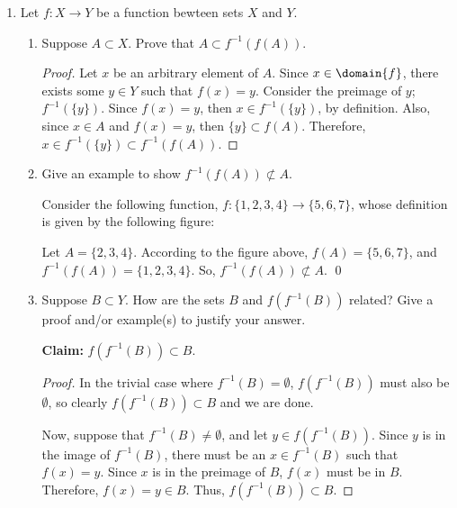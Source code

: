 \documentclass[letterpaper]{article}
\begin{document}
\begin{enumerate}
\item Let $f:X \to Y$ be a function bewteen sets $X$ and $Y$. 
\begin{enumerate}[label=(\alph*)]
\item Suppose $A \subset X$. Prove that $A \subset f^{-1}(f(A))$.
\begin{proof}
Let $x$ be an arbitrary element of $A$. Since $x \in \domain{f}$, there exists some $y \in Y$ such that $f(x)=y$. Consider the preimage of $y$; $f^{-1}(\{y\})$. Since $f(x)=y$, then $x \in f^{-1}(\{y\})$, by definition. Also, since $x \in A$ and $f(x)=y$, then $\{y\} \subset f(A)$. Therefore, $x \in f^{-1}(\{y\}) \subset f^{-1}(f(A)).$
\end{proof}
\pagebreak
\item Give an example to show $f^{-1}(f(A)) \not\subset A$.
\begin{example*} Consider the following function, $f:\{1,2,3,4\} \to \{5,6,7\}$, whose definition is given by the following figure:
\begin{center}
\end{center}
Let $A=\{2,3,4\}$. According to the figure above, $f(A)=\{5,6,7\}$, and $f^{-1}(f(A))=\{1,2,3,4\}$. So, $f^{-1}(f(A)) \not\subset A$. \qed
\end{example*}
\item Suppose $B \subset Y$. How are the sets $B$ and $f(f^{-1}(B))$ related? Give a proof and/or example(s) to justify your answer. 

\textbf{Claim:} $f(f^{-1}(B)) \subset B$.

\begin{proof}
In the trivial case where $f^{-1}(B) = \emptyset$, $f(f^{-1}(B))$ must also be $\emptyset$, so clearly $f(f^{-1}(B)) \subset B$ and we are done. 

Now, suppose that $f^{-1}(B) \neq \emptyset$, and let $y \in f(f^{-1}(B))$. Since $y$ is in the image of $f^{-1}(B)$, there must be an $x \in f^{-1}(B)$ such that $f(x)=y$. Since $x$ is in the preimage of $B$, $f(x)$ must be in $B$. Therefore, $f(x)=y \in B$. Thus, $f(f^{-1}(B)) \subset B$.
\end{proof}


\end{enumerate}
\end{enumerate}
\end{document}

